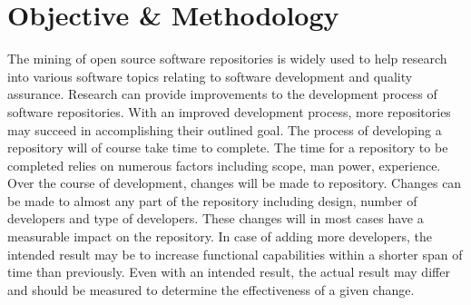 
\section{Objective \& Methodology}

The mining of open source software repositories is widely used to help research into various software topics relating to software development and quality assurance. Research can provide improvements to the development process of software repositories. With an improved development process, more repositories may succeed in accomplishing their outlined goal. The process of developing a repository will of course take time to complete. The time for a repository to be completed relies on numerous factors including scope, man power, experience. Over the course of development, changes will be made to repository. Changes can be made to almost any part of the repository including design, number of developers and type of developers. These changes will in most cases have a measurable impact on the repository. In case of adding more developers, the intended result may be to increase functional capabilities within a shorter span of time than previously. Even with an intended result, the actual result may differ and should be measured to determine the effectiveness of a given change.

